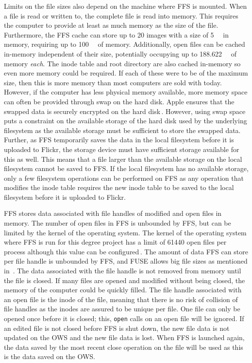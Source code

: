 Limits on the file sizes also depend on the machine where \gls{FFS} is mounted. When a file is read or written to, the complete file is read into memory. This requires the computer to provide at least as much memory as the size of the file. Furthermore, the \gls{FFS} cache can store up to 20 images with a size of \SI{5}{\mega\byte} in memory, requiring up to \SI{100}{\mega\byte} of memory. Additionally, open files can be cached in-memory independent of their size, potentially occupying up to \SI{188.622}{\giga\byte} of memory \textit{each}. The inode table and root directory are also cached \mbox{in-memory} so even more memory could be required. If each of these were to be of the maximum size, then this is more memory than most computers are sold with today. However, if the computer has less physical memory available, more memory space can often be provided through swap on the hard disk. Apple ensures that the swapped data is securely encrypted on the hard disk\,\cite{appleinc.WhatSecureVirtual2022}. However, using swap space puts a constraint on the available storage of the hard disk used by the underlying filesystem as the available storage must be sufficient to store the swapped data. Further, as \gls{FFS} temporarily saves the data in the local filesystem before it is uploaded to Flickr, the storage device must have sufficient storage available for this as well. This means that a file larger than the available storage on the local filesystem cannot be saved to \gls{FFS}. If the local filesystem has no available storage, only a few filesystem operations can be performed on \gls{FFS} as any operation that modifies the inode table requires the new inode table to be saved to the local filesystem before it is uploaded to Flickr. 

\gls{FFS} stores data associated with file handles of modified and open files in memory. The number of open files in \gls{FFS} is unbounded by \gls{FFS}, but can be limited by the kernel of the operating system. The kernel of the operating system where \gls{FFS} is run for this degree project has a limit of \num {61440} open files per process although this value can be configured\,\cite{kryptedMaximumFilesMac2009}. The amount of data \gls{FFS} can store per file handle is unbounded by \gls{FFS}, and \gls{FUSE} allows big file sizes as mentioned in~. The data associated with the file handle is not removed from memory until the file is closed. If many files are opened and modified without being closed, the memory of the computer could be quickly filled. The file handle associated with an open file is the inode of the file, meaning that there is no risk of collision of file handles as the inodes are assured to be unique per file. One file can only be opened once before it is closed; this, \texttt{open} calls on an open file will be ignored. If an edited file is not closed before \gls{FFS} is shut down, the new file data is not updated on the \gls{OWS} and the new file data is lost. When \gls{FFS} is launched again, the data saved by the most recent close operation on the file will be used as this is the data saved on the \gls{OWS}.

